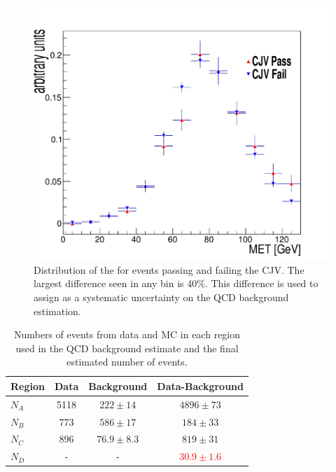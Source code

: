\begin{figure}
  \includegraphics[width=1.2\largefigwidth]{plots/prompt/AN-12-403-figs/QCD3_CtrlLo_MET.pdf}
  \caption{Distribution of the \METnoMU for events passing and failing the \ac{CJV}. The largest difference seen in any bin is 40\%. This difference is used to assign as a systematic uncertainty on the \ac{QCD} background estimation.}
  \label{prompt:qcdmetcjv}
\end{figure}

\begin{table}
  \caption{Numbers of events from data and \ac{MC} in each region used in the \ac{QCD} background estimate and the final estimated number of events.}
  \label{tab:promptqcd}
  \begin{tabular}{lccc}
    \hline
    \hline
    Region & Data & Background & Data-Background \\
    \hline
    \hline
    $N_{A}$ & 5118 & $222\pm 14$ & $4896\pm 73$\\
    $N_{B}$ & 773  & $586\pm 17$ & $184 \pm 33$\\
    $N_{C}$ & 896  & $76.9\pm 8.3$ & $819\pm 31$\\
    \hline
    $N_{D}$ & - & - & \textcolor{red}{$30.9\pm 1.6$}\\
    \hline
    \hline
  \end{tabular}
\end{table}

